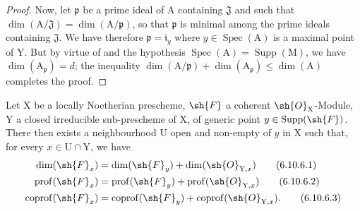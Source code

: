 \begin{proof}
Now, let $\mathfrak{p}$ be a prime ideal of $\mathrm{A}$ containing $\mathfrak{J}$ and such that $\dim(\mathrm{A}/\mathfrak{J})=\dim(\mathrm{A}/\mathfrak{p})$, so that $\mathfrak{p}$ is minimal among the prime ideals containing $\mathfrak{J}$. We have therefore $\mathfrak{p}=\mathfrak{i}_y$ where $y\in\operatorname{Spec}(\mathrm{A})$ is a maximal point of $\mathrm{Y}$. But by virtue of  and the hypothesis $\operatorname{Spec}(\mathrm{A})=\operatorname{Supp}(\mathrm{M})$, we have $\dim(\mathrm{A}_\mathfrak{p})=d$; the inequality $\dim(\mathrm{A}/\mathfrak{p})+\dim(\mathrm{A}_\mathfrak{p})\leqslant\dim(\mathrm{A})$  completes the proof.
\end{proof}

\begin{proposition}[6.10.6]
\label{IV.6.10.6}
Let $\mathrm{X}$ be a locally Noetherian prescheme, $\sh{F}$ a coherent $\sh{O}_\mathrm{X}$-Module, $\mathrm{Y}$ a closed irreducible sub-prescheme of $\mathrm{X}$, of generic point $y\in\operatorname{Supp}(\sh{F})$. There then exists a neighbourhood $\mathrm{U}$ open and non-empty of $y$ in $\mathrm{X}$ such that, for every $x\in\mathrm{U}\cap\mathrm{Y}$, we have
\begin{align}
  \dim(\sh{F}_x) &= \dim(\sh{F}_y)+\dim(\sh{O}_{\mathrm{Y},x}) \tag{6.10.6.1}\label{IV.6.10.6.1}\\
  \operatorname{prof}(\sh{F}_x) &= \operatorname{prof}(\sh{F}_y)+\operatorname{prof}(\sh{O}_{\mathrm{Y},x}) \tag{6.10.6.2}\label{IV.6.10.6.2}\\
  \operatorname{coprof}(\sh{F}_x) &= \operatorname{coprof}(\sh{F}_y)+\operatorname{coprof}(\sh{O}_{\mathrm{Y},x}). \tag{6.10.6.3}\label{IV.6.10.6.3}
\end{align}
\end{proposition}


